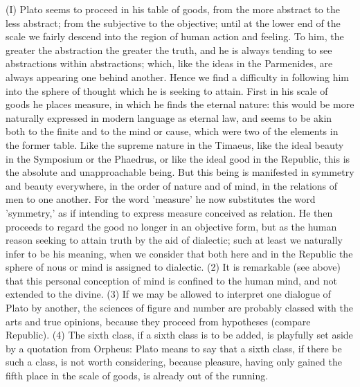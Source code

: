 \documentclass[11pt,letter]{article}
\begin{document}
\par  (I) Plato seems to proceed in his table of goods, from the more abstract to the less abstract; from the subjective to the objective; until at the lower end of the scale we fairly descend into the region of human action and feeling. To him, the greater the abstraction the greater the truth, and he is always tending to see abstractions within abstractions; which, like the ideas in the Parmenides, are always appearing one behind another. Hence we find a difficulty in following him into the sphere of thought which he is seeking to attain. First in his scale of goods he places measure, in which he finds the eternal nature: this would be more naturally expressed in modern language as eternal law, and seems to be akin both to the finite and to the mind or cause, which were two of the elements in the former table. Like the supreme nature in the Timaeus, like the ideal beauty in the Symposium or the Phaedrus, or like the ideal good in the Republic, this is the absolute and unapproachable being. But this being is manifested in symmetry and beauty everywhere, in the order of nature and of mind, in the relations of men to one another. For the word 'measure' he now substitutes the word 'symmetry,' as if intending to express measure conceived as relation. He then proceeds to regard the good no longer in an objective form, but as the human reason seeking to attain truth by the aid of dialectic; such at least we naturally infer to be his meaning, when we consider that both here and in the Republic the sphere of nous or mind is assigned to dialectic. (2) It is remarkable (see above) that this personal conception of mind is confined to the human mind, and not extended to the divine. (3) If we may be allowed to interpret one dialogue of Plato by another, the sciences of figure and number are probably classed with the arts and true opinions, because they proceed from hypotheses (compare Republic). (4) The sixth class, if a sixth class is to be added, is playfully set aside by a quotation from Orpheus: Plato means to say that a sixth class, if there be such a class, is not worth considering, because pleasure, having only gained the fifth place in the scale of goods, is already out of the running.
\end{document}
